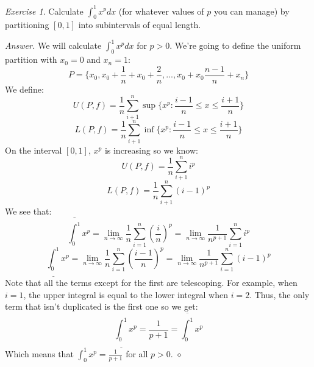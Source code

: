 \documentclass[12pt,oneside]{amsart}
\theoremstyle{definition}
\theoremstyle{remark}
\newtheorem{exer}{Exercise}
\numberwithin{equation}{exer}
\newenvironment{answer}{\bigskip\noindent\emph{Answer.}}{\hfill$\diamond$\newline}
\newcommand{\upRiemannint}[2]{
  \overline{\int_{#1}^{#2}}
}
\newcommand{\loRiemannint}[2]{
  \underline{\int_{#1}^{#2}}
}
\begin{document}
\newpage
\begin{exer}
Calculate $\int_{0}^{1}x^pdx$ (for whatever values of $p$ you can manage) by partitioning $[0,1]$ into subintervals of equal length.
\end{exer}
\begin{answer}
We will calculate $\int_{0}^{1}x^pdx$ for $p>0$. We're going to define the uniform partition with $x_0=0$ and $x_n=1$:
$$P=\{x_0,x_0+\frac{1}{n}+x_0+\frac{2}{n},...,x_0+x_0\frac{n-1}{n}+x_n\}$$
We define:
$$U(P,f)=\frac{1}{n}\sum_{i+1}^{n}\sup \{x^p:\frac{i-1}{n}\leq x \leq \frac{i+1}{n}\}$$
$$L(P,f)=\frac{1}{n}\sum_{i+1}^{n}\inf \{x^p:\frac{i-1}{n}\leq x \leq \frac{i+1}{n}\}$$
On the interval $[0,1]$, $x^p$ is increasing so we know:
$$U(P,f)=\frac{1}{n}\sum_{i+1}^{n}i^p$$
$$L(P,f)=\frac{1}{n}\sum_{i+1}^{n}(i-1)^p$$
We see that:
$$\upRiemannint{0}{1}x^p=\lim_{n\rightarrow \infty}\frac{1}{n}\sum_{i=1}^{n}(\frac{i}{n})^p=\lim_{n\rightarrow \infty}\frac{1}{n^{p+1}}\sum_{i=1}^{n}i^p$$
$$\loRiemannint{0}{1}x^p=\lim_{n\rightarrow \infty}\frac{1}{n}\sum_{i=1}^{n}(\frac{i-1}{n})^p=\lim_{n\rightarrow \infty}\frac{1}{n^{p+1}}\sum_{i=1}^{n}(i-1)^p$$
Note that all the terms except for the first are telescoping. For example, when $i=1$, the upper integral is equal to the lower integral when $i=2$. Thus, the only term that isn't duplicated is the first one so we get:
$$\loRiemannint{0}{1}x^p=\frac{1}{p+1}=\upRiemannint{0}{1}x^p$$
Which means that $\int_{0}^{1}x^p=\frac{1}{p+1}$ for all $p>0$.
\end{answer}
\end{document}
